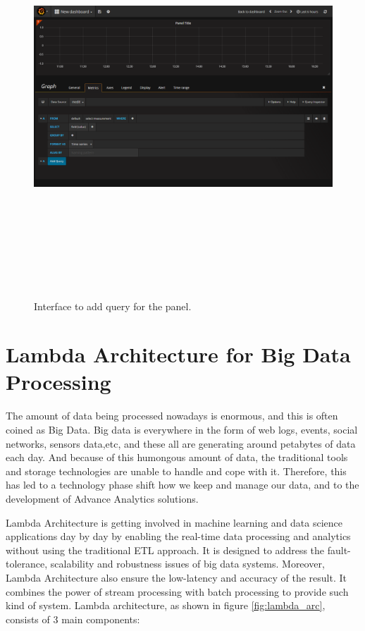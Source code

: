  \begin{figure}[htpb]
	\centering
	\includegraphics[width=16cm,height=15cm,keepaspectratio=true]{images/gr_query}
	\caption{
		Interface to add query for the panel.
	}
	\label{fig:gr_query}
\end{figure}


\section{Lambda Architecture for Big Data Processing} \label{sec:lmb_arc}
The amount of data being processed nowadays is enormous, and this is often coined as Big Data. Big data is everywhere in the form of web logs, events, social networks, sensors data,etc, and these all are generating around petabytes of data each day. And because of this humongous amount of data, the traditional tools and storage technologies are unable to handle and cope with it. Therefore, this has led to a technology phase shift how we keep and manage our data, and to the development of Advance Analytics solutions.

Lambda Architecture \cite{UBDLAH} \cite{oreillyla} \cite{7364082} \cite{maprla} is getting involved in machine learning and data science applications day by day by enabling the real-time data processing and analytics without using the traditional ETL approach. It is designed to address the fault-tolerance, scalability and robustness issues of big data systems. Moreover, Lambda Architecture also ensure the low-latency and accuracy of the result. It combines the power of stream processing with batch processing to provide such kind of system.
Lambda architecture, as shown in figure \ref{fig:lambda_arc}, consists of 3 main components:


